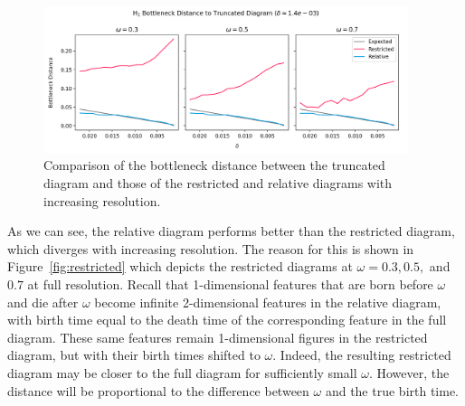 \begin{figure}[htbp]
  \centering
  \includegraphics[width=0.95\textwidth]{figures/matching-bottleneck_delta.png}
  \caption{Comparison of the bottleneck distance between the truncated diagram and those of the restricted and relative diagrams with increasing resolution.}\label{fig:bottleneck}
\end{figure}

As we can see, the relative diagram performs better than the restricted diagram, which diverges with increasing resolution.
The reason for this is shown in Figure~\ref{fig:restricted} which depicts the restricted diagrams at $\omega = 0.3, 0.5,$ and $0.7$ at full resolution.
Recall that 1-dimensional features that are born before $\omega$ and die after $\omega$ become infinite 2-dimensional features in the relative diagram, with birth time equal to the death time of the corresponding feature in the full diagram.
These same features remain 1-dimensional figures in the restricted diagram, but with their birth times shifted to $\omega$.
Indeed, the resulting restricted diagram may be closer to the full diagram for sufficiently small $\omega$.
However, the distance will be proportional to the difference between $\omega$ and the true birth time.

